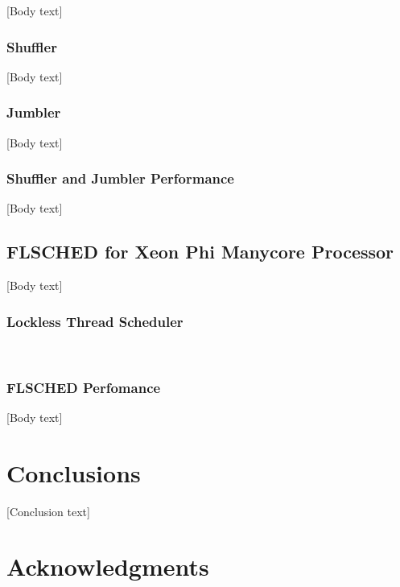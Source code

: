 \documentclass{sig-alternate}
\begin{document}
[Body text]

\subsubsection{Shuffler}
\label{sec:shuffler}

[Body text]

\subsubsection{Jumbler}
\label{sec:jumbler}

[Body text]

\subsubsection{Shuffler and Jumbler Performance}
\label{sec:sj_performance}

[Body text]

\subsection{FLSCHED for Xeon Phi Manycore Processor}
\label{sec:flsched}

[Body text]

\subsubsection{Lockless Thread Scheduler}
\label{sec:flsched_about}

\cite{Lozi:2016, NisarEtal:2017}
~\cite{KumarEtal:2014}

\subsubsection{FLSCHED Perfomance}
\label{sec:flsched_performance}

[Body text]

\section{Conclusions}
\label{sec:conclusions}

[Conclusion text]

\section*{Acknowledgments}
\label{sec:acknowledgments}



  
\end{document}
